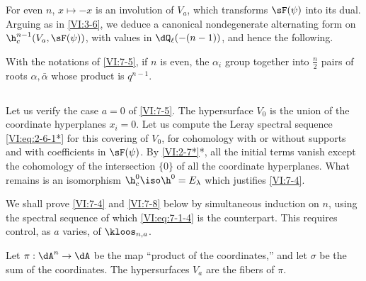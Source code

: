 \documentclass[oneside]{book}
\begin{document}
For even $n$, $x\mapsto -x$ is an involution of $V_a$, which transforms 
$\sF(\psi)$ into its dual. Arguing as in \ref{VI:3-6}, we deduce a 
canonical nondegenerate alternating form on $\h_c^{n-1}(V_a,\sF(\psi))$, 
with values in $\dQ_\ell(-(n-1))$, and hence the following. 





\begin{corollary_}\label{VI:7-6}
With the notations of \ref{VI:7-5}, if $n$ is even, the $\alpha_i$ group together 
into $\frac n 2$ pairs of roots $\alpha,\bar\alpha$ whose product is 
$q^{n-1}$. 
\end{corollary_}





\subsection{}\label{VI:7-7}

Let us verify the case $a=0$ of \ref{VI:7-5}. The hypersurface $V_0$ is the union 
of the coordinate hyperplanes $x_i=0$. Let us compute the Leray spectral sequence 
\eqref{VI:eq:2-6-1*} for this covering of $V_0$, for cohomology with or 
without supports and with coefficients in $\sF(\psi)$. By \ref{VI:2-7*}*, all 
the initial terms vanish except the cohomology of the intersection $\{0\}$ of 
all the coordinate hyperplanes. What remains is an isomorphism 
$\h_c^0{}\iso \h^0{}=E_\lambda$ which justifies \ref{VI:7-4}. 

We shall prove \ref{VI:7-4} and \ref{VI:7-8} below by simultaneous induction 
on $n$, using the spectral sequence of which 
\eqref{VI:eq:7-1-4} is the counterpart. This requires control, as $a$ varies, 
of $\kloos_{n,a}$. 

Let $\pi:\dA^n \to \dA$ be the map ``product of the coordinates,'' and let 
$\sigma$ be the sum of the coordinates. The hypersurfaces $V_a$ are the fibers of 
$\pi$.
\end{document}
